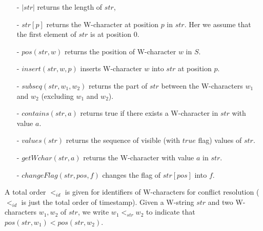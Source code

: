 \begin{itemize}
\setlength{\itemsep}{0.5pt}
\item[-] $\vert str \vert$ returns the length of $str$,

\item[-] $str[p]$ returns the W-character at position $p$ in $str$. Her we assume that the first element of $str$ is at position 0.

\item[-] $pos(str,w)$ returns the position of W-character $w$ in $S$.

\item[-] $insert(str,w,p)$ inserts W-character $w$ into $str$ at position $p$.

\item[-] $subseq(str,w_1,w_2)$ returns the part of $str$ between the W-characters $w_1$ and $w_2$ (excluding $w_1$ and $w_2$).

\item[-] $contains(str,a)$ returns true if there exists a W-character in $str$ with value $a$.

\item[-] $values(str)$ returns the sequence of visible (with $\mathit{true}$ flag) values of $str$.

\item[-] $getWchar(str,a)$ returns the W-character with value $a$ in $str$.

\item[-] $changeFlag(str,pos,f)$ changes the flag of $str[pos]$ into $f$.
\end{itemize}


A total order $<_{id}$ is given for identifiers of W-characters for conflict resolution ($<_{id}$ is just the total order of timestamp). Given a W-string $str$ and two W-characters $w_1,w_2$ of $str$, we write $w_1 <_{str} w_2$ to indicate that $pos(str,w_1) < pos(str,w_2)$.


